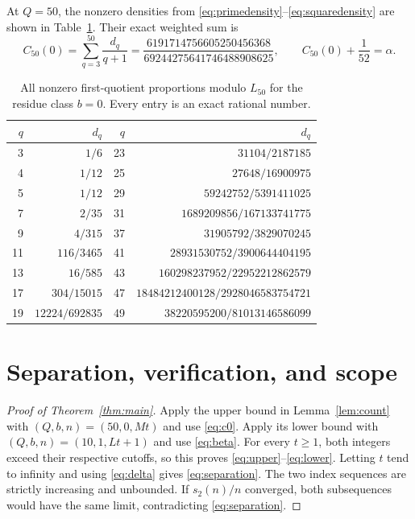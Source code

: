 \documentclass[11pt]{article}
\begin{document}
At $Q=50$, the nonzero densities from
\eqref{eq:primedensity}--\eqref{eq:squaredensity} are shown in
Table~\ref{tab:densities}. Their exact weighted sum is
\begin{equation}\label{eq:c0}
 C_{50}(0)=\sum_{q=3}^{50}\frac{d_q}{q+1}
 =\frac{6191714756605250456368}{69244275641746488908625},
 \qquad C_{50}(0)+\frac1{52}=\alpha.
\end{equation}
\begin{table}[tb]
\centering
\small
\begin{tabular}{rr@{\qquad}rr}
\toprule
$q$&$d_q$&$q$&$d_q$\\
\midrule
3&$1/6$&23&$31104/2187185$\\
4&$1/12$&25&$27648/16900975$\\
5&$1/12$&29&$59242752/5391411025$\\
7&$2/35$&31&$1689209856/167133741775$\\
9&$4/315$&37&$31905792/3829070245$\\
11&$116/3465$&41&$28931530752/3900644404195$\\
13&$16/585$&43&$160298237952/22952212862579$\\
17&$304/15015$&47&$18484212400128/2928046583754721$\\
19&$12224/692835$&49&$38220595200/81013146586099$\\
\bottomrule
\end{tabular}
\caption{All nonzero first-quotient proportions modulo $L_{50}$ for
the residue class $b=0$. Every entry is an exact rational number.}
\label{tab:densities}
\end{table}

\section{Separation, verification, and scope}

\begin{proof}[Proof of Theorem~\ref{thm:main}]
Apply the upper bound in Lemma~\ref{lem:count} with
$(Q,b,n)=(50,0,Mt)$ and use \eqref{eq:c0}. Apply its lower bound
with $(Q,b,n)=(10,1,Lt+1)$ and use \eqref{eq:beta}. For every
$t\ge1$, both integers exceed their respective cutoffs, so this proves
\eqref{eq:upper}--\eqref{eq:lower}. Letting $t$ tend to infinity
and using \eqref{eq:delta} gives \eqref{eq:separation}.
The two index sequences are strictly increasing and unbounded. If
$s_2(n)/n$ converged, both subsequences would have the same limit,
contradicting \eqref{eq:separation}.
\end{proof}
\end{document}

